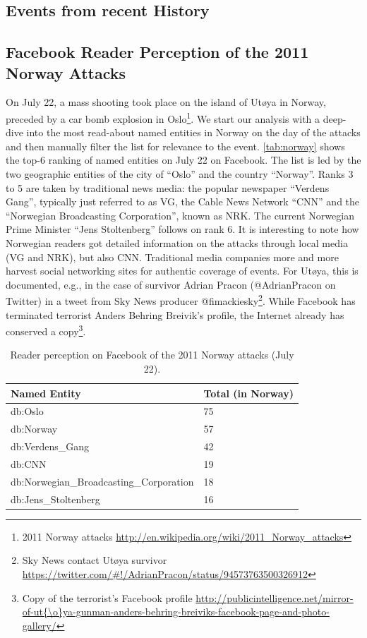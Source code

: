 \documentclass{iosart2c}
\begin{document}
\subsection{Events from recent History}

\subsection{Facebook Reader Perception of the 2011 Norway Attacks}
On July 22, a mass shooting took place on the island of Utøya in Norway, preceded by a car bomb explosion in Oslo\footnote{2011 Norway attacks \url{http://en.wikipedia.org/wiki/2011_Norway_attacks}}.
We start our analysis with a deep-dive into the most read-about named entities in Norway on the day of the attacks and then manually filter the list for relevance to the event.
\autoref{tab:norway} shows the top-6 ranking of named entities on July 22 on Facebook.
The list is led by the two geographic entities of the city of ``Oslo'' and the country ``Norway''.
Ranks 3 to 5 are taken by traditional news media: the popular newspaper ``Verdens Gang'', typically just referred to as VG, the Cable News Network ``CNN'' and the ``Norwegian Broadcasting Corporation'', known as NRK.
The current Norwegian Prime Minister ``Jens Stoltenberg'' follows on rank 6.
It is interesting to note how Norwegian readers got detailed information on the attacks through local media (VG and NRK), but also CNN.
Traditional media companies more and more harvest social networking sites for authentic coverage of events.
For Utøya, this is documented, e.g., in the case of survivor Adrian Pracon (@AdrianPracon on Twitter) in a tweet from Sky News producer @fimackiesky\footnote{Sky News contact Utøya survivor \url{https://twitter.com/\#!/AdrianPracon/status/94573763500326912}}.
While Facebook has terminated terrorist Anders Behring Breivik's profile, the Internet already has conserved a copy\footnote{Copy of the terrorist's Facebook profile \url{http://publicintelligence.net/mirror-of-ut{\o}ya-gunman-anders-behring-breiviks-facebook-page-and-photo-gallery/}}. 

\begin{table}
    \begin{tabular}{ | l | l |}
    \hline
	\textbf{Named Entity} & \textbf{Total (in Norway)}\\ \hline
	db:Oslo & 75\\
	db:Norway & 57\\
	db:Verdens\_Gang & 42\\
	db:CNN & 19\\
	db:Norwegian\_Broadcasting\_Corporation & 18\\
	db:Jens\_Stoltenberg & 16\\
    \hline
  \end{tabular}
  \caption{Reader perception on Facebook of the 2011 Norway attacks (July 22).}
  \label{tab:norway}  
\end{table}
\end{document}
